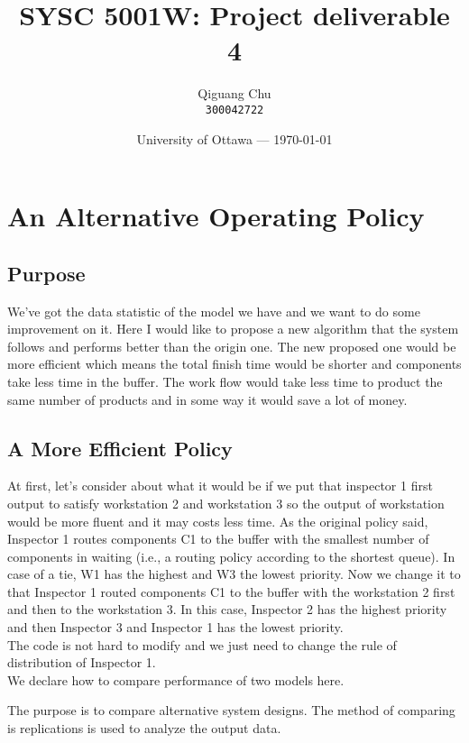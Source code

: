 \documentclass{article}
\title{SYSC 5001W: Project deliverable 4} %
\author{Qiguang Chu\\ \texttt{300042722}} %
\date{University of Ottawa --- \today} %
\begin{document}
\maketitle

\section{An Alternative Operating Policy}
\subsection{Purpose}
We've got the data statistic of the model we have and we want to do some improvement on it. Here I would like to propose a new algorithm that the system follows and performs better than the origin one. The new proposed one would be more efficient which means the total finish time would be shorter and components take less time in the buffer. The work flow would take less time to product the same number of products and in some way it would save a lot of money.

\subsection{A More Efficient Policy}
At first, let's consider about what it would be if we put that inspector 1 first output to satisfy workstation 2 and workstation 3 so the output of workstation would be more fluent and it may costs less time. As the original policy said, Inspector 1 routes components C1 to the buffer with the smallest number of components in waiting (i.e., a routing policy according to the shortest queue). In case of a tie, W1 has the highest and W3 the lowest priority. Now we change it to that Inspector 1 routed components C1 to the buffer with the workstation 2 first and then to the workstation 3. In this case, Inspector 2 has the highest priority and then Inspector 3 and Inspector 1 has the lowest priority. \\
The code is not hard to modify and we just need to change the rule of distribution of Inspector 1.\\






 We declare how to compare performance of two models here. 



The purpose is to compare alternative system designs. The method of comparing is replications is used to analyze the output data.
\end{document}
